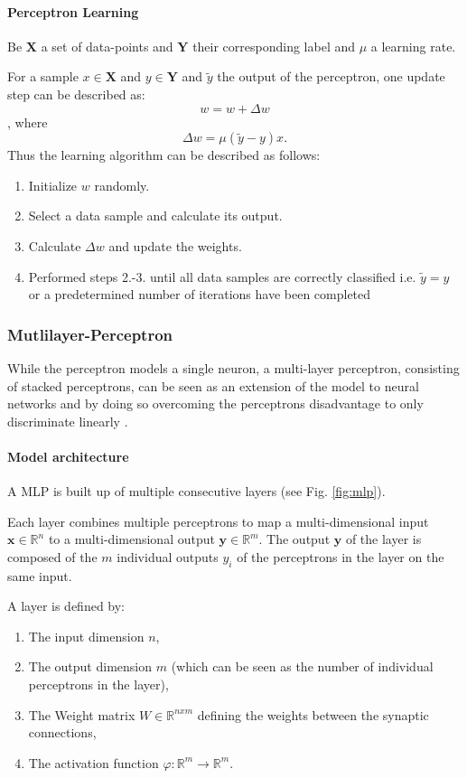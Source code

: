 \paragraph{Perceptron Learning}

Be $\textbf{X}$ a set of data-points and $\textbf{Y}$ their corresponding label and $\mu$ a learning rate. 

For a sample $x \in \textbf{X}$  and $y \in \textbf{Y}$ and $\tilde{y}$ the output of the perceptron, one update step can be described as:
\[ 
	w = w + \Delta w
\]
, where 
\[
	\Delta w = \mu (\tilde{y}-y) x .
\]
Thus the learning algorithm can be described as follows:

\begin{enumerate}
	\item Initialize $w$ randomly.
	\item Select a data sample and calculate its output.
	\item Calculate $\Delta w$ and update the weights.
	\item Performed steps 2.-3. until all data samples are correctly classified i.e. $\tilde{y} = y$ or a predetermined number of iterations have been completed
\end{enumerate}


\subsubsection{Mutlilayer-Perceptron}

While the perceptron models a single neuron, a multi-layer perceptron, consisting of stacked perceptrons, can be seen as an extension of the model to neural networks and by doing so overcoming the perceptrons disadvantage to only discriminate linearly \cite{rumelhart1985learning}\cite{Goodfellow-et-al-2016-Book}. 

\paragraph{Model architecture}

A MLP is built up of multiple consecutive layers (see Fig. \ref{fig:mlp}).

Each layer combines multiple perceptrons to map a multi-dimensional input $\textbf{x} \in \mathbb{R}^n$ to a multi-dimensional output $\textbf{y} \in \mathbb{R}^m$.
The output $\textbf{y}$ of the layer is composed of the $m$ individual outputs $y_i$ of the perceptrons in the layer on the same input.


A layer is defined by:
\begin{enumerate}
	\item The input dimension $n$,
	\item The output dimension $m$ (which can be seen as the number of individual perceptrons in the layer),
	\item The Weight matrix $W \in \mathbb{R}^{nxm} $ defining the weights between the synaptic connections,
	\item The activation function $\varphi : \mathbb{R}^m \rightarrow \mathbb{R}^m $.
\end{enumerate}

